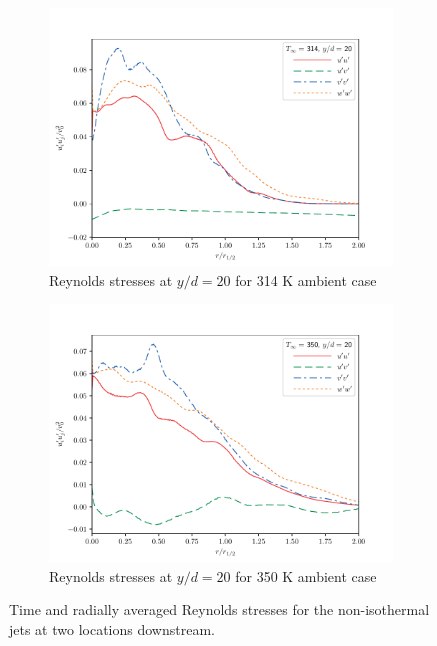 \begin{figure}[ht!]
\begin{center}
\begin{subfigure}{0.45\textwidth}
	\includegraphics[scale=.45]{figures/Plots/radial/slices_5/314_ambient/Rey_Stress_0_2.pdf}
	\caption{Reynolds stresses at $y/d=20$ for 314 K ambient case} \label{314_rey_20}
\end{subfigure}
\begin{subfigure}{0.45\textwidth}
	\includegraphics[scale=.45]{figures/Plots/radial/slices_5/350_ambient/Rey_Stress_0_2.pdf}
	\caption{Reynolds stresses at $y/d=20$ for 350 K ambient case} \label{350_rey_20}
\end{subfigure}
\caption{Time and radially averaged Reynolds stresses for the non-isothermal jets at two locations downstream.}
\label{noniso_reynolds_features}
\end{center}
\end{figure}

